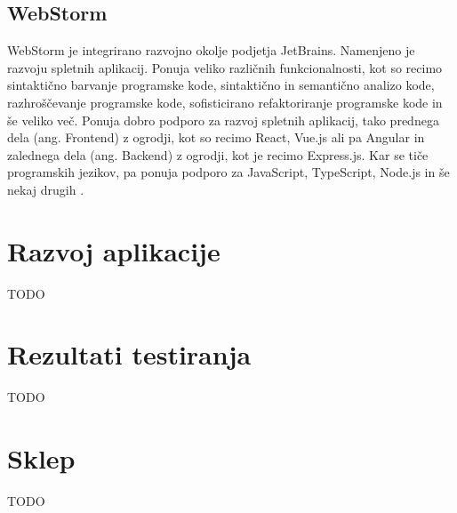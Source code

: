 \documentclass[a4paper,12pt,openright]{book}
\begin{document}
\section{WebStorm}
WebStorm je integrirano razvojno okolje podjetja JetBrains.
Namenjeno je razvoju spletnih aplikacij. 
Ponuja veliko različnih funkcionalnosti, kot so recimo sintaktično barvanje programske kode, sintaktično in semantično
analizo kode, razhroščevanje programske kode, sofisticirano refaktoriranje programske kode in še veliko več.
Ponuja dobro podporo za razvoj spletnih aplikacij, tako prednega dela (ang. Frontend) z ogrodji, kot so recimo React, Vue.js ali pa Angular
in zalednega dela (ang. Backend) z ogrodji, kot je recimo Express.js.
Kar se tiče programskih jezikov, pa ponuja podporo za JavaScript, TypeScript, Node.js in še nekaj drugih \cite{jetbrains_webstorm}.


\chapter{Razvoj aplikacije}
TODO


\chapter{Rezultati testiranja}
TODO


\chapter{Sklep}
TODO




\printbibliography[heading=bibintoc,type=article,title={Članki v revijah}]

\printbibliography[heading=bibintoc,type=inproceedings,title={Članki v zbornikih}]

\printbibliography[heading=bibintoc,type=incollection,title={Poglavja v knjigah}]

\printbibliography[heading=bibintoc,title={Celotna literatura}]
\end{document}
